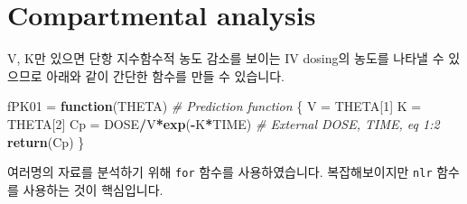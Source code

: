 \documentclass[
  9pt,
]{krantz}
\newenvironment{Shaded}{\begin{snugshade}}{\end{snugshade}}
\newcommand{\CommentTok}[1]{\textcolor[rgb]{0.56,0.35,0.01}{\textit{#1}}}
\newcommand{\ControlFlowTok}[1]{\textcolor[rgb]{0.13,0.29,0.53}{\textbf{#1}}}
\newcommand{\DecValTok}[1]{\textcolor[rgb]{0.00,0.00,0.81}{#1}}
\newcommand{\KeywordTok}[1]{\textcolor[rgb]{0.13,0.29,0.53}{\textbf{#1}}}
\newcommand{\NormalTok}[1]{#1}
\newcommand{\OperatorTok}[1]{\textcolor[rgb]{0.81,0.36,0.00}{\textbf{#1}}}
\newcommand{\StringTok}[1]{\textcolor[rgb]{0.31,0.60,0.02}{#1}}
\begin{document}
\hypertarget{compartmental-analysis}{%
\section{Compartmental analysis}\label{compartmental-analysis}}

V, K만 있으면 단항 지수함수적 농도 감소를 보이는 IV dosing의 농도를 나타낼 수 있으므로 아래와 같이 간단한 함수를 만들 수 있습니다.

\begin{Shaded}
\begin{Highlighting}[]
\NormalTok{fPK01 =}\StringTok{ }\ControlFlowTok{function}\NormalTok{(THETA) }\CommentTok{# Prediction function}
\NormalTok{\{}
\NormalTok{  V  =}\StringTok{ }\NormalTok{THETA[}\DecValTok{1}\NormalTok{]}
\NormalTok{  K  =}\StringTok{ }\NormalTok{THETA[}\DecValTok{2}\NormalTok{]}
\NormalTok{  Cp =}\StringTok{ }\NormalTok{DOSE}\OperatorTok{/}\NormalTok{V}\OperatorTok{*}\KeywordTok{exp}\NormalTok{(}\OperatorTok{-}\NormalTok{K}\OperatorTok{*}\NormalTok{TIME)  }\CommentTok{# External DOSE, TIME, eq 1:2}
  \KeywordTok{return}\NormalTok{(Cp)}
\NormalTok{\}}
\end{Highlighting}
\end{Shaded}

여러명의 자료를 분석하기 위해 \texttt{for} 함수를 사용하였습니다. 복잡해보이지만 \texttt{nlr} 함수를 사용하는 것이 핵심입니다.
\end{document}
